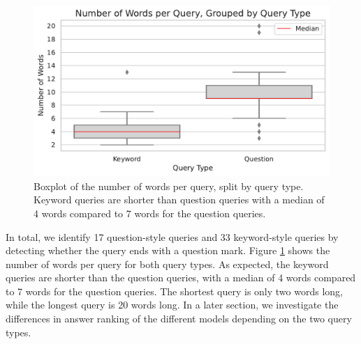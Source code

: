 \begin{figure}
\centering
\includegraphics[width=\textwidth]{images/num_words_per_query.pdf}
\caption{Boxplot of the number of words per query, split by query type. Keyword queries are shorter than question queries with a median of 4 words compared to 7 words for the question queries.}
\label{fig:num_words_per_query}
\end{figure}
In total, we identify 17 question-style queries and 33 keyword-style queries by detecting whether the query ends with a question mark.
Figure \ref{fig:num_words_per_query} shows the number of words per query for both query types.
As expected, the keyword queries are shorter than the question queries, with a median of 4 words compared to 7 words for the question queries.
The shortest query is only two words long, while the longest query is 20 words long.
In a later section, we investigate the differences in answer ranking of the different models depending on the two query types.

